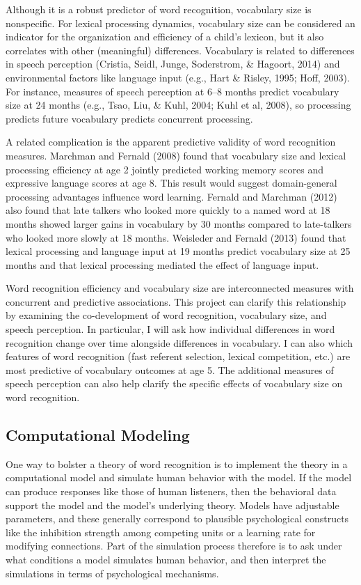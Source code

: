 \documentclass[]{book}
\theoremstyle{definition}
\theoremstyle{definition}
\theoremstyle{remark}
\begin{document}
Although it is a robust predictor of word recognition, vocabulary size
is nonspecific. For lexical processing dynamics, vocabulary size can be
considered an indicator for the organization and efficiency of a child's
lexicon, but it also correlates with other (meaningful) differences.
Vocabulary is related to differences in speech perception (Cristia,
Seidl, Junge, Soderstrom, \& Hagoort, 2014) and environmental factors
like language input (e.g., Hart \& Risley, 1995; Hoff, 2003). For
instance, measures of speech perception at 6--8 months predict
vocabulary size at 24 months (e.g., Tsao, Liu, \& Kuhl, 2004; Kuhl et
al, 2008), so processing predicts future vocabulary predicts concurrent
processing.

A related complication is the apparent predictive validity of word
recognition measures. Marchman and Fernald (2008) found that vocabulary
size and lexical processing efficiency at age 2 jointly predicted
working memory scores and expressive language scores at age 8. This
result would suggest domain-general processing advantages influence word
learning. Fernald and Marchman (2012) also found that late talkers who
looked more quickly to a named word at 18 months showed larger gains in
vocabulary by 30 months compared to late-talkers who looked more slowly
at 18 months. Weisleder and Fernald (2013) found that lexical processing
and language input at 19 months predict vocabulary size at 25 months and
that lexical processing mediated the effect of language input.

Word recognition efficiency and vocabulary size are interconnected
measures with concurrent and predictive associations. This project can
clarify this relationship by examining the co-development of word
recognition, vocabulary size, and speech perception. In particular, I
will ask how individual differences in word recognition change over time
alongside differences in vocabulary. I can also which features of word
recognition (fast referent selection, lexical competition, etc.) are
most predictive of vocabulary outcomes at age 5. The additional measures
of speech perception can also help clarify the specific effects of
vocabulary size on word recognition.

\subsection{Computational Modeling}\label{computational-modeling}

One way to bolster a theory of word recognition is to implement the
theory in a computational model and simulate human behavior with the
model. If the model can produce responses like those of human listeners,
then the behavioral data support the model and the model's underlying
theory. Models have adjustable parameters, and these generally
correspond to plausible psychological constructs like the inhibition
strength among competing units or a learning rate for modifying
connections. Part of the simulation process therefore is to ask under
what conditions a model simulates human behavior, and then interpret the
simulations in terms of psychological mechanisms.
\end{document}
